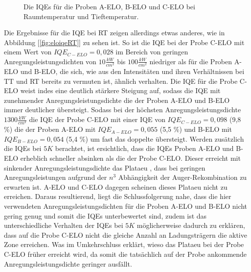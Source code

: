 \begin{figure}[H]
\begin{minipage}[t]{0.49\textwidth}
    \label{fig:elocorriqeRT}
  \end{minipage}
	\caption{Die IQEs für die Proben A-ELO, B-ELO und C-ELO bei Raumtemperatur und Tieftemperatur.}
\end{figure}
\noindent 
%
Die Ergebnisse für die IQE bei RT zeigen allerdings etwas anderes, wie in Abbildung [\ref{fig:eloiqeRT}] zu sehen ist. 
So ist die IQE bei der Probe C-ELO mit einem Wert von $IQE_{C-ELO} = 0,028$
im Bereich von geringen Anregungsleistungsdichten von $ 10 \frac{kW}{cm^2} $ bis $ 100 \frac{kW}{cm^2} $ niedriger als für die Proben A-ELO und B-ELO, die sich, wie aus den Intensitäten und ihren Verhältnissen bei TT und RT bereits zu vermuten ist, ähnlich verhalten. 
Die IQE für die Probe C-ELO weist indes eine deutlich stärkere Steigung auf, sodass die IQE mit zunehmender Anregungsleistungsdichte die der Proben A-ELO und B-ELO immer deutlicher übersteigt. Sodass bei der höchsten Anregungsleistungsdichte $ 1300 \frac{kW}{cm^2} $ die IQE der Probe C-ELO mit einer IQE von $IQE_{C-ELO} = 0,098$ (9,8 \%) die der Proben A-ELO mit $IQE_{A-ELO} = 0,055$ (5,5 \%) und B-ELO mit $IQE_{B-ELO} = 0,054$ (5,4 \%) um fast das doppelte übersteigt. Werden zusätzlich die IQEs bei $5K$ berachtet, ist ersichtlich, dass die IQEs Proben A-ELO und B-ELO erheblich schneller absinken als die der Probe C-ELO. Dieser erreicht mit sinkender Anregungsleistungsdichte das Plataeu , dass bei geringen Anregungsleistungen aufgrund der $n^3$ Abhängigkeit der Auger-Rekombination zu erwarten ist. A-ELO und C-ELO dagegen scheinen dieses Plataeu nicht zu erreichen. Daraus resultierend, liegt die Schlussfolgerung nahe, dass die hier verwendeten Anregungsleistungsdichten für die Proben A-ELO und B-ELO nicht gering genug und somit die IQEs unterbewertet sind, zudem ist das unterschiedliche Verhalten der IQEs bei $5K$ möglicherweise dadurch zu erklären, dass auf die Probe C-ELO nicht die gleiche Anzahl an Ladungsträgern die aktive Zone erreichen. Was im Umkehrschluss erklärt, wieso das Plataeu bei der Probe C-ELO früher erreicht wird, da somit die tatsächlich auf der Probe ankommende Anregungsleistungsdichte geringer ausfällt.  
%
